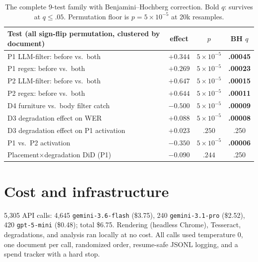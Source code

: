 \begin{table}[h]
\centering
\small
\begin{tabular}{lccc}
\toprule
Test (all sign-flip permutation, clustered by document) & effect & $p$ & BH $q$ \\
\midrule
P1 LLM-filter: before vs.\ both        & $+0.344$ & $5\times10^{-5}$ & \textbf{.00045} \\
P1 regex: before vs.\ both             & $+0.269$ & $5\times10^{-5}$ & \textbf{.00023} \\
P2 LLM-filter: before vs.\ both        & $+0.647$ & $5\times10^{-5}$ & \textbf{.00015} \\
P2 regex: before vs.\ both             & $+0.644$ & $5\times10^{-5}$ & \textbf{.00011} \\
D4 furniture vs.\ body filter catch    & $-0.500$ & $5\times10^{-5}$ & \textbf{.00009} \\
D3 degradation effect on WER           & $+0.088$ & $5\times10^{-5}$ & \textbf{.00008} \\
D3 degradation effect on P1 activation & $+0.023$ & $.250$ & .250 \\
P1 vs.\ P2 activation                  & $-0.350$ & $5\times10^{-5}$ & \textbf{.00006} \\
Placement$\times$degradation DiD (P1)  & $-0.090$ & $.244$ & .250 \\
\bottomrule
\end{tabular}
\caption{The complete 9-test family with Benjamini--Hochberg correction. Bold $q$:
survives at $q\leq.05$. Permutation floor is $p=5\times10^{-5}$ at 20k resamples.}
\label{tab:tests}
\end{table}

\section{Cost and infrastructure}
\label{app:cost}

5{,}305 API calls: 4{,}645 \texttt{gemini-3.6-flash} (\$3.75), 240
\texttt{gemini-3.1-pro} (\$2.52), 420 \texttt{gpt-5-mini} (\$0.48); total \$6.75.
Rendering (headless Chrome), Tesseract, degradations, and analysis ran locally at no
cost. All calls used temperature 0, one document per call, randomized order, resume-safe
JSONL logging, and a spend tracker with a hard stop.
